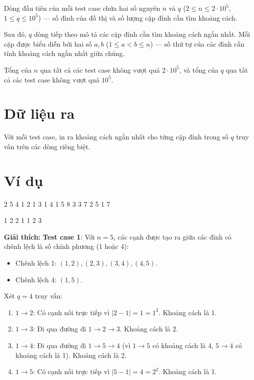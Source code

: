 \documentclass[11pt]{article}
\newcommand{\explanation}[1]{
    \vspace{0.5cm}
    \noindent \textbf{Giải thích:} #1
}
\begin{document}
Dòng đầu tiên của mỗi test case chứa hai số nguyên $n$ và $q$ ($2 \le n \le 2 \cdot 10^5$, $1 \le q \le 10^5$) — số đỉnh của đồ thị và số lượng cặp đỉnh cần tìm khoảng cách.

Sau đó, $q$ dòng tiếp theo mô tả các cặp đỉnh cần tìm khoảng cách ngắn nhất. Mỗi cặp được biểu diễn bởi hai số $a, b$ ($1 \leq a < b \leq n$) — số thứ tự của các đỉnh cần tính khoảng cách ngắn nhất giữa chúng.

\begin{constraintbox}
Tổng của $n$ qua tất cả các test case không vượt quá $2 \cdot 10^5$, và tổng của $q$ qua tất cả các test case không vượt quá $10^5$.
\end{constraintbox}

\section*{Dữ liệu ra}
Với mỗi test case, in ra khoảng cách ngắn nhất cho từng cặp đỉnh trong số $q$ truy vấn trên các dòng riêng biệt.

\section*{Ví dụ}
\begin{inputbox}
2
5 4
1 2
1 3
1 4
1 5
8 3
3 7
2 5
1 7
\end{inputbox}
\begin{outputbox}
1
2
2
1
1
2
3
\end{outputbox}

\explanation

\textbf{Test case 1}: Với $n = 5$, các cạnh được tạo ra giữa các đỉnh có chênh lệch là số chính phương (1 hoặc 4):
\begin{itemize}
    \item Chênh lệch 1: $(1, 2), (2, 3), (3, 4), (4, 5)$.
    \item Chênh lệch 4: $(1, 5)$.
\end{itemize}
Xét $q=4$ truy vấn:
\begin{enumerate}
    \item $1 \to 2$: Có cạnh nối trực tiếp vì $|2 - 1| = 1 = 1^2$. Khoảng cách là 1.
    \item $1 \to 3$: Đi qua đường đi $1 \to 2 \to 3$. Khoảng cách là 2.
    \item $1 \to 4$: Đi qua đường đi $1 \to 5 \to 4$ (vì $1 \to 5$ có khoảng cách là 4, $5 \to 4$ có khoảng cách là 1). Khoảng cách là 2.
    \item $1 \to 5$: Có cạnh nối trực tiếp vì $|5 - 1| = 4 = 2^2$. Khoảng cách là 1.
\end{enumerate}
\end{document}
